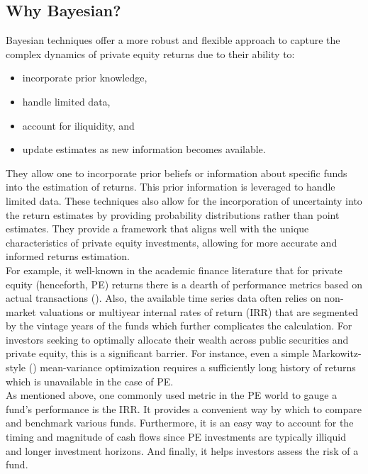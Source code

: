 \documentclass[11pt]{article}
\begin{document}
\subsection{Why Bayesian?}
Bayesian techniques offer a more robust and flexible approach to capture the complex dynamics of private equity returns due to their ability to:
\begin{itemize}
	\item incorporate prior knowledge,
	\item handle limited data,
	\item account for iliquidity, and
	\item update estimates as new information becomes available.
\end{itemize}

They allow one to incorporate prior beliefs or information about specific funds into the estimation of returns. This prior information is leveraged to handle limited data. These techniques also allow for the incorporation of uncertainty into the return estimates by providing probability distributions rather than point estimates. They provide a framework that aligns well with the unique characteristics of private equity investments, allowing for more accurate and informed returns estimation. \\

For example, it well-known in the academic finance literature that for private equity (henceforth, PE) returns there is a dearth of performance metrics based on actual transactions (\cite{Kaplan2005}). Also, the available time series data often relies on non-market valuations or multiyear internal rates of return (IRR) that are segmented by the vintage years of the funds which further complicates the calculation. For investors seeking to optimally allocate their wealth across public securities and private equity, this is a significant barrier. For instance, even a simple Markowitz-style (\cite{markowitz}) mean-variance optimization requires a sufficiently long history of returns which is unavailable in the case of PE. \\

As mentioned above, one commonly used metric in the PE world to gauge a fund’s performance is the IRR. It provides a convenient way by which to compare and benchmark various funds. Furthermore, it is an easy way to account for the timing and magnitude of cash flows since PE investments are typically illiquid and longer investment horizons. And finally, it helps investors assess the risk of a fund. \\
\end{document}
